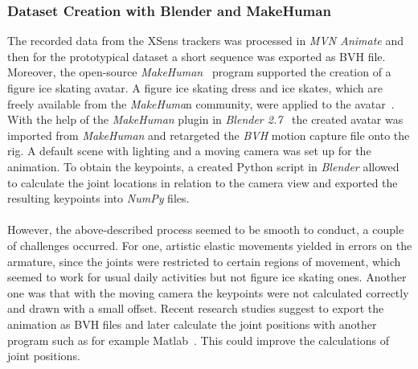 \subsubsection*{Dataset Creation with Blender and MakeHuman}
The recorded data from the XSens trackers was processed in \textit{MVN Animate} and then for the prototypical dataset
a short sequence was exported as BVH file.
Moreover, the open-source \textit{MakeHuman}~\cite{makehuman} program supported the creation of a figure ice skating avatar.
A figure ice skating dress and ice skates, which are freely available from the \textit{MakeHuma}n
community, were applied to the avatar~\cite{makehumanassets}.
With the help of the \textit{MakeHuman }plugin in \textit{Blender 2.7}~\cite{blender} the created avatar was imported from \textit{MakeHuman}
and retargeted the \textit{BVH} motion capture file onto the rig.
A default scene with lighting and a moving camera was set up for the animation.
To obtain the keypoints, a created Python script in \textit{Blender} allowed to calculate the joint locations in relation to the camera
view and exported the resulting keypoints into \textit{NumPy} files.
\\\mbox{}\\
However, the above-described process seemed to be smooth to conduct, a couple of challenges occurred.
For one, artistic elastic movements yielded in errors on the armature, since the joints were restricted to certain
regions of movement, which seemed to work for usual daily activities but not figure ice skating ones.
Another one was that with the moving camera the keypoints were not calculated correctly and drawn with a small offset.
Recent research studies suggest to export the animation as BVH files and later calculate the joint positions with another
program such as for example Matlab~\cite{synpose300, 3dpeople, gaitblender}. This could improve the calculations of joint
positions.


